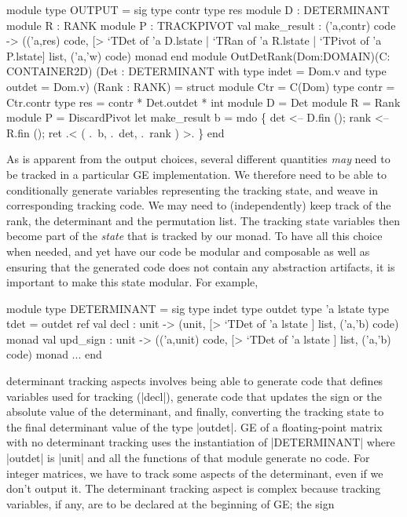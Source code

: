 \documentclass{llncs}
\begin{document}
\begin{code}
module type OUTPUT = sig
  type contr  type res
  module D : DETERMINANT   module R : RANK   module P : TRACKPIVOT
  val make_result : ('a,contr) code -> 
    (('a,res) code,
     [> `TDet of 'a D.lstate | `TRan of 'a R.lstate | `TPivot of 'a P.lstate]
       list, ('a,'w) code) monad
end
module OutDetRank(Dom:DOMAIN)(C: CONTAINER2D)
    (Det : DETERMINANT with type indet = Dom.v and type outdet = Dom.v)
    (Rank : RANK) = struct
  module Ctr = C(Dom)
  type contr = Ctr.contr
  type res = contr * Det.outdet * int
  module D = Det   module R = Rank   module P = DiscardPivot
  let make_result b = mdo \{ det  <-- D.fin ();  rank <-- R.fin ();
    ret .< ( .~b, .~det, .~rank ) >. \}
end
\end{code}

As is apparent from the output choices, several different quantities
\emph{may} need to be tracked in a particular GE implementation.  We
therefore need to be able to conditionally generate variables
representing the tracking state, and weave in corresponding tracking
code. We may need to (independently) keep track of the rank, the
determinant and the permutation list.  The tracking state variables
then become part of the \emph{state} that is tracked by our monad.  To
have all this choice when needed, and yet have our code be modular and
composable as well as ensuring that the generated code does not
contain any abstraction artifacts, it is important to make this state
modular.  For example,
\begin{code}
module type DETERMINANT = sig
  type indet  type outdet  type 'a lstate
  type tdet = outdet ref   
  val decl : unit -> 
    (unit, [> `TDet of 'a lstate ] list, ('a,'b) code) monad
  val upd_sign : unit -> 
    (('a,unit) code, [> `TDet of 'a lstate ] list, ('a,'b) code) monad
  ...
end
\end{code}
\noindent  determinant tracking aspects involves being able to
generate code that defines variables used for tracking (|decl|),
generate code that updates the sign or the absolute
value of the determinant, and finally, converting the tracking state
to the final determinant value of the type |outdet|. GE of a
floating-point matrix with no determinant tracking uses the
instantiation of |DETERMINANT| where |outdet| is |unit| and all the
functions of that module generate no code. For integer matrices, we
have to track some aspects of the determinant, even if we don't output
it. The determinant tracking aspect is complex because tracking
variables, if any, are to be declared at the beginning of GE; the sign
\end{document}
